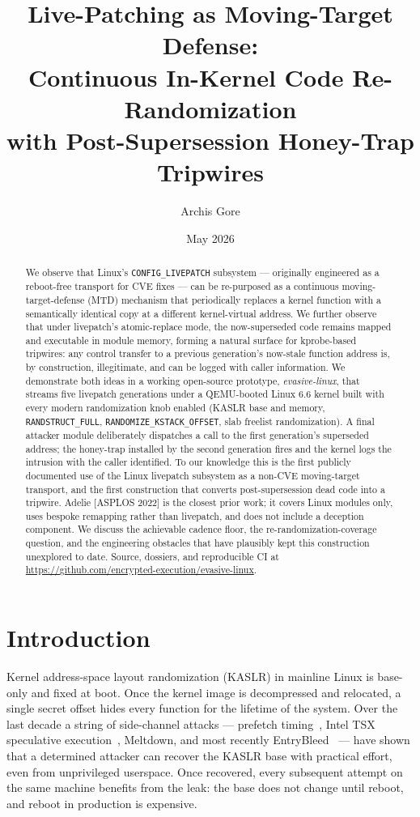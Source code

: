 \documentclass[10pt,letterpaper]{article}
\title{Live-Patching as Moving-Target Defense:\\
Continuous In-Kernel Code Re-Randomization\\
with Post-Supersession Honey-Trap Tripwires}
\author[1]{Archis Gore}
\affil[1]{Encrypted Execution \quad \texttt{me@archisgore.com}}
\date{May 2026}
\begin{document}
\maketitle

\begin{abstract}
We observe that Linux's \texttt{CONFIG\_LIVEPATCH} subsystem ---
originally engineered as a reboot-free transport for CVE fixes --- can
be re-purposed as a continuous moving-target-defense (MTD) mechanism
that periodically replaces a kernel function with a semantically
identical copy at a different kernel-virtual address. We further
observe that under livepatch's atomic-replace mode, the
now-superseded code remains mapped and executable in module memory,
forming a natural surface for kprobe-based tripwires: any control
transfer to a previous generation's now-stale function address is, by
construction, illegitimate, and can be logged with caller information.
We demonstrate both ideas in a working open-source prototype,
\emph{evasive-linux}, that streams five livepatch generations under a
QEMU-booted Linux 6.6 kernel built with every modern randomization
knob enabled (KASLR base and memory, \texttt{RANDSTRUCT\_FULL},
\texttt{RANDOMIZE\_KSTACK\_OFFSET}, slab freelist randomization). A
final attacker module deliberately dispatches a call to the first
generation's superseded address; the honey-trap installed by the
second generation fires and the kernel logs the intrusion with the
caller identified. To our knowledge this is the first publicly
documented use of the Linux livepatch subsystem as a non-CVE
moving-target transport, and the first construction that converts
post-supersession dead code into a tripwire. Adelie [ASPLOS 2022] is
the closest prior work; it covers Linux modules only, uses bespoke
remapping rather than livepatch, and does not include a deception
component. We discuss the achievable cadence floor, the
re-randomization-coverage question, and the engineering obstacles
that have plausibly kept this construction unexplored to date.
Source, dossiers, and reproducible CI at
\url{https://github.com/encrypted-execution/evasive-linux}.
\end{abstract}

\section{Introduction}

Kernel address-space layout randomization (KASLR) in mainline Linux
is base-only and fixed at boot. Once the kernel image is decompressed
and relocated, a single secret offset hides every function for the
lifetime of the system. Over the last decade a string of side-channel
attacks --- prefetch timing~\cite{hund_prefetch,gruss_prefetch}, Intel
TSX speculative execution~\cite{drk}, Meltdown, and most recently
EntryBleed~\cite{entrybleed} --- have shown that a determined
attacker can recover the KASLR base with practical effort, even from
unprivileged userspace. Once recovered, every subsequent attempt on
the same machine benefits from the leak: the base does not change
until reboot, and reboot in production is expensive.
\end{document}
